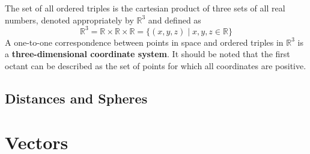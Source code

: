 \documentclass[../Calculus_\Roman{3}]{subfiles}
\begin{document}
			The set of all ordered triples is the cartesian product of three sets of all real numbers, denoted appropriately by $\mathbb{R}^3$ and defined as
			\[\mathbb{R}^3 = \mathbb{R} \times \mathbb{R} \times \mathbb{R} = \{(x, y, z) \mid x, y, z \in \mathbb{R}\}\]
			A one-to-one correspondence between points in space and ordered triples in $\mathbb{R}^3$ is a \textbf{three-dimensional coordinate system}. It should be noted that the first octant can be described as the set of points for which all coordinates are positive.
			\subsection*{Distances and Spheres}
		\section{Vectors}
\end{document}
